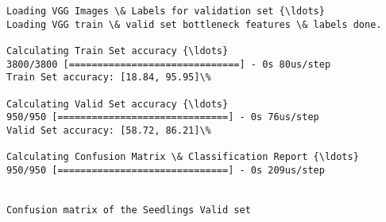 \documentclass[11pt]{article}
\begin{document}
    \begin{Verbatim}[commandchars=\\\{\}]
Loading VGG Images \& Labels for validation set {\ldots}
Loading VGG train \& valid set bottleneck features \& labels done.

Calculating Train Set accuracy {\ldots}
3800/3800 [==============================] - 0s 80us/step
Train Set accuracy: [18.84, 95.95]\%

Calculating Valid Set accuracy {\ldots}
950/950 [==============================] - 0s 76us/step
Valid Set accuracy: [58.72, 86.21]\%

Calculating Confusion Matrix \& Classification Report {\ldots}
950/950 [==============================] - 0s 209us/step


Confusion matrix of the Seedlings Valid set



    \end{Verbatim}
\end{document}
